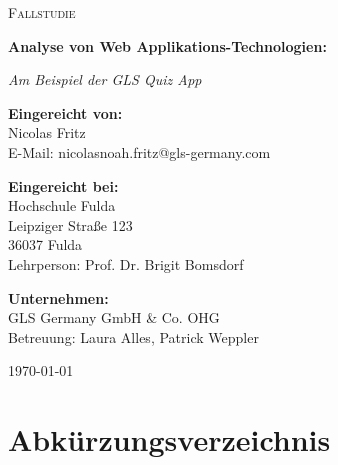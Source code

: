 \documentclass[biblatex]{lni}
\begin{document}
\begin{titlepage}
  \centering
  \vspace*{0.5cm}

  {\scshape\LARGE Fallstudie \par}

  {\huge\bfseries
    Analyse von Web Applikations-Technologien:
  \par
  }
  {\Large\itshape Am Beispiel der GLS Quiz App\par}

  \vspace{1cm}

  {\Large\textbf{Eingereicht von: }}\\
  Nicolas Fritz \\
  E-Mail: nicolasnoah.fritz@gls-germany.com

  \vspace{1cm}

  {\Large\textbf{Eingereicht bei: }}\\
  Hochschule Fulda \\
  Leipziger Straße 123 \\
  36037 Fulda \\
  Lehrperson: Prof. Dr. Brigit Bomsdorf

  \vspace{1cm}

  {\Large\textbf{Unternehmen: }}\\
  GLS Germany GmbH & Co. OHG \\
  Betreuung: Laura Alles, Patrick Weppler

  \vfill

  {\large \today\par}
\end{titlepage}

\tableofcontents
\listoffigures
\newpage

\section*{Abkürzungsverzeichnis}
\begin{acronym}[Bash]
\end{acronym}
\newpage
\end{document}
